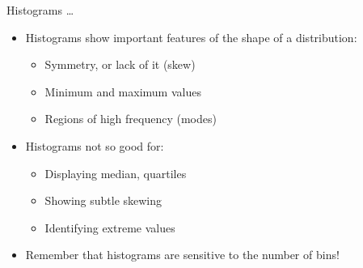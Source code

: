 \documentclass[10pt]{beamer}\usepackage[]{graphicx}\usepackage[]{color}
\begin{document}
		
\begin{frame}{Histograms \dots}
			\protect\hypertarget{histograms-1}{}

\begin{itemize}
\item Histograms show important features of the shape of a distribution:
			
			\begin{itemize}
				\item
				Symmetry, or lack of it (skew)
				\item
				Minimum and maximum values
				\item
				Regions of high frequency (modes)
			\end{itemize}
	\pause		
		\item 	Histograms not so good for:
			
			\begin{itemize}
				\item
				Displaying median, quartiles
				\item
				Showing subtle skewing
				\item
				Identifying extreme values
			\end{itemize}
		
		\pause
		\item Remember that histograms are sensitive to the number of bins!

\end{itemize}			
			
\end{frame}
\end{document}
